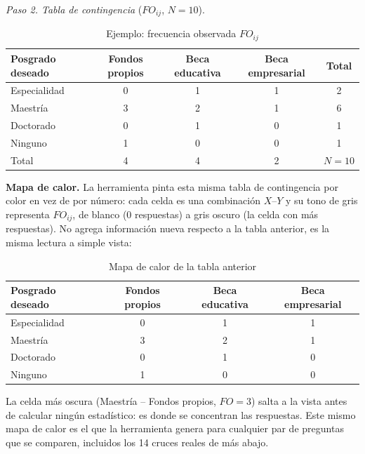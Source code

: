 \documentclass[12pt, a4paper]{article}
\newenvironment{mitabla}[2][H]{%
  \begin{table}[#1]
  \centering
  \caption{#2}
  \small
}{%
  \end{table}
}
\begin{document}
\textit{Paso 2. Tabla de contingencia} ($FO_{ij}$, $N = 10$).

\begin{mitabla}{Ejemplo: frecuencia observada $FO_{ij}$}
\begin{tabular}{lccc|c}
\toprule
Posgrado deseado & Fondos propios & Beca educativa & Beca empresarial & Total \\
\midrule
Especialidad & 0 & 1 & 1 & 2 \\
Maestría & 3 & 2 & 1 & 6 \\
Doctorado & 0 & 1 & 0 & 1 \\
Ninguno & 1 & 0 & 0 & 1 \\
\midrule
Total & 4 & 4 & 2 & $N = 10$ \\
\bottomrule
\end{tabular}
\end{mitabla}

\textbf{Mapa de calor.} La herramienta pinta esta misma tabla de
contingencia por color en vez de por número: cada celda es una
combinación $X$--$Y$ y su tono de gris representa $FO_{ij}$, de blanco
(0 respuestas) a gris oscuro (la celda con más respuestas). No agrega
información nueva respecto a la tabla anterior, es la misma lectura a
simple vista:

\begin{mitabla}{Mapa de calor de la tabla anterior}
\begin{tabular}{lccc}
\toprule
Posgrado deseado & Fondos propios & Beca educativa & Beca empresarial \\
\midrule
Especialidad      & \cellcolor{gray!0}0  & \cellcolor{gray!25}1 & \cellcolor{gray!25}1 \\
Maestría          & \cellcolor{gray!75}3 & \cellcolor{gray!50}2 & \cellcolor{gray!25}1 \\
Doctorado         & \cellcolor{gray!0}0  & \cellcolor{gray!25}1 & \cellcolor{gray!0}0  \\
Ninguno           & \cellcolor{gray!25}1 & \cellcolor{gray!0}0  & \cellcolor{gray!0}0  \\
\bottomrule
\end{tabular}
\end{mitabla}

La celda más oscura (Maestría -- Fondos propios, $FO=3$) salta a la
vista antes de calcular ningún estadístico: es donde se concentran las
respuestas. Este mismo mapa de calor es el que la herramienta genera
para cualquier par de preguntas que se comparen, incluidos los 14 cruces
reales de más abajo.
\end{document}
